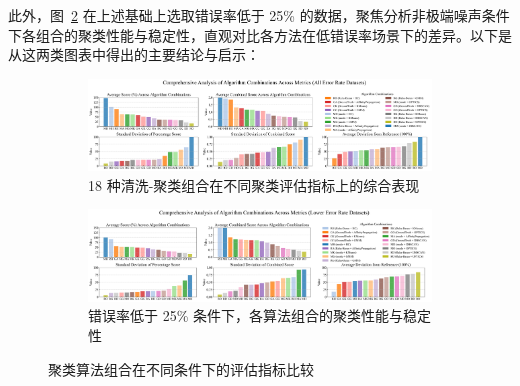 \documentclass[10pt]{article} %
\numberwithin{equation}{section}
\begin{document}
此外，图~\ref{fig:alg_comb_metrics_low} 在上述基础上选取错误率低于 25\% 的数据，聚焦分析非极端噪声条件下各组合的聚类性能与稳定性，直观对比各方法在低错误率场景下的差异。以下是从这两类图表中得出的主要结论与启示：

\begin{figure}[htbp]
    \centering
    \setlength{\abovecaptionskip}{5pt}  %
    \setlength{\belowcaptionskip}{5pt}  %

    \begin{subfigure}{1.0\linewidth}  %
        \centering
        \includegraphics[width=\linewidth]{figures/alg_comb_metrics.png}
        \caption{18 种清洗-聚类组合在不同聚类评估指标上的综合表现}
        \label{fig:alg_comb_metrics}
    \end{subfigure}

    \vspace{1em}  %

    \begin{subfigure}{1.0\linewidth}  %
        \centering
        \includegraphics[width=\linewidth]{figures/alg_comb_metrics_low.png}
        \caption{错误率低于 25\% 条件下，各算法组合的聚类性能与稳定性}
        \label{fig:alg_comb_metrics_low}
    \end{subfigure}

    \caption{聚类算法组合在不同条件下的评估指标比较}
    \label{fig:alg_comb_metrics_comparison}
\end{figure}
\end{document}

